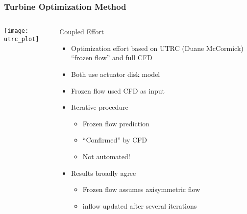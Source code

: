 \documentclass[mathserif]{beamer}
\begin{document}
%
%
\begin{frame}
 \frametitle{Turbine Optimization Method}

 \begin{columns}[]
  \begin{column}{0.45\linewidth}
   \begin{center}
    \texttt{[image: utrc\_plot]}
   \end{center}

  \end{column}
    \begin{column}{0.55\linewidth}

     \begin{block}{Coupled Effort}
     \begin{itemize}
      \item Optimization effort based on UTRC (Duane McCormick) ``frozen flow'' 
	    and full CFD
      \item Both use actuator disk model
      \item Frozen flow used CFD as input
      \item Iterative procedure
	    \begin{itemize}
	     \item Frozen flow prediction 
	     \item ``Confirmed'' by CFD
	     \item Not automated!
	    \end{itemize}
      \item Results broadly agree
	    \begin{itemize}
	     \item Frozen flow assumes axisymmetric flow
	     \item inflow updated after several iterations
	    \end{itemize}
     \end{itemize}

      \end{block}
    \end{column}
 \end{columns}
\end{frame}
\end{document}
